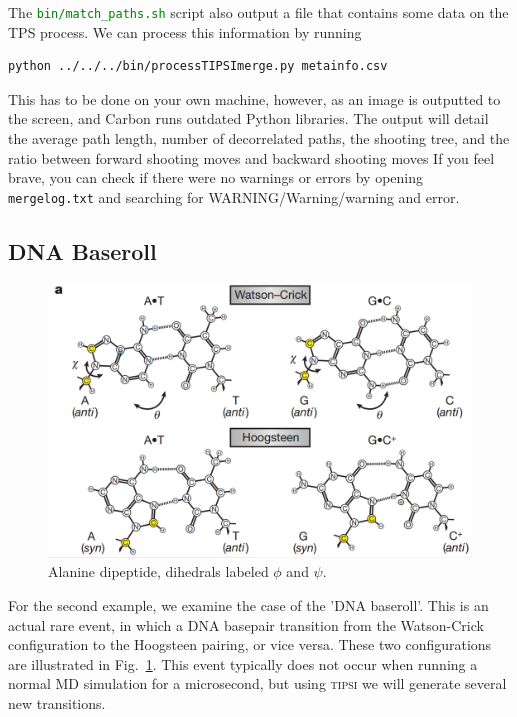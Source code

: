 \documentclass[]{article}
\begin{document}
The \textcolor{green}{\texttt{bin/match\_paths.sh}} script also output a file that contains some data on the TPS process. We can process this information by running
%
\begin{lstlisting}
python ../../../bin/processTIPSImerge.py metainfo.csv
\end{lstlisting}
% 
This has to be done on your own machine, however, as an image is outputted to the screen, and Carbon runs outdated Python libraries. The output will detail the average path length, number of decorrelated paths, the shooting tree, and the ratio between forward shooting moves and backward shooting moves If you feel brave, you can check if there were no warnings or errors by opening \texttt{mergelog.txt} and searching for WARNING/Warning/warning and error. 

\newpage

\subsection*{DNA Baseroll}

\begin{figure}[ht]
    \centering
    \includegraphics[scale=0.25]{images/pairing.png}
    \caption{Alanine dipeptide, dihedrals labeled $\phi$ and $\psi$.}
    \label{fig:dnabr}
\end{figure}

For the second example, we examine the case of the 'DNA baseroll'. This is an actual rare event, in which a DNA basepair transition from the Watson-Crick configuration to the Hoogsteen pairing, or vice versa. These two configurations are illustrated in Fig.~\ref{fig:dnabr}. This event typically does not occur when running a normal MD simulation for a microsecond, but using \textsc{tipsi} we will generate several new transitions.
\end{document}
